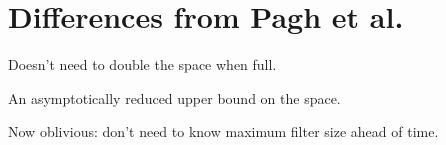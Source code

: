 \documentclass[letterpaper]{article}
\begin{document}

















\section{Differences from Pagh et al.}

Doesn't need to double the space when full.

An asymptotically reduced upper bound on the space.

Now oblivious: don't need to know maximum filter size ahead of time.
\end{document}
